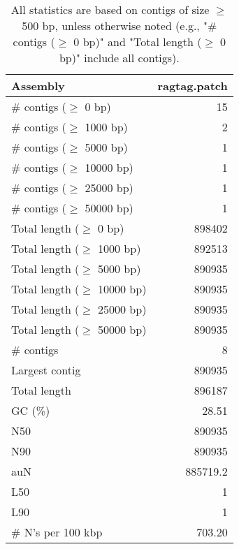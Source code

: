 \documentclass[12pt,a4paper]{article}
\begin{document}
\begin{table}[ht]
\begin{center}
\caption{All statistics are based on contigs of size $\geq$ 500 bp, unless otherwise noted (e.g., "\# contigs ($\geq$ 0 bp)" and "Total length ($\geq$ 0 bp)" include all contigs).}
\begin{tabular}{|l*{1}{|r}|}
\hline
Assembly & ragtag.patch \\ \hline
\# contigs ($\geq$ 0 bp) & 15 \\ \hline
\# contigs ($\geq$ 1000 bp) & 2 \\ \hline
\# contigs ($\geq$ 5000 bp) & 1 \\ \hline
\# contigs ($\geq$ 10000 bp) & 1 \\ \hline
\# contigs ($\geq$ 25000 bp) & 1 \\ \hline
\# contigs ($\geq$ 50000 bp) & 1 \\ \hline
Total length ($\geq$ 0 bp) & 898402 \\ \hline
Total length ($\geq$ 1000 bp) & 892513 \\ \hline
Total length ($\geq$ 5000 bp) & 890935 \\ \hline
Total length ($\geq$ 10000 bp) & 890935 \\ \hline
Total length ($\geq$ 25000 bp) & 890935 \\ \hline
Total length ($\geq$ 50000 bp) & 890935 \\ \hline
\# contigs & 8 \\ \hline
Largest contig & 890935 \\ \hline
Total length & 896187 \\ \hline
GC (\%) & 28.51 \\ \hline
N50 & 890935 \\ \hline
N90 & 890935 \\ \hline
auN & 885719.2 \\ \hline
L50 & 1 \\ \hline
L90 & 1 \\ \hline
\# N's per 100 kbp & 703.20 \\ \hline
\end{tabular}
\end{center}
\end{table}
\end{document}
